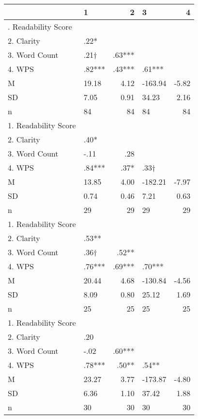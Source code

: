 \begin{longtable}{llrlr}
\toprule
  & 1 & 2 & 3 & 4 \\ 
\midrule\addlinespace[2.5pt]
1. Readability Score &  &  &  &  \\ 
2. Clarity &  .22* &  &  &  \\ 
3. Word Count &  .21† &  .63*** &  &  \\ 
4. WPS &  .82*** &  .43*** &  .61*** &  \\ 
M & 19.18 & 4.12 & -163.94 & -5.82 \\ 
SD & 7.05 & 0.91 & 34.23 & 2.16 \\ 
n & 84 & 84 & 84 & 84 \\ 
1. Readability Score &  &  &  &  \\ 
2. Clarity &  .40* &  &  &  \\ 
3. Word Count & -.11  &  .28  &  &  \\ 
4. WPS &  .84*** &  .37* &  .33† &  \\ 
M & 13.85 & 4.00 & -182.21 & -7.97 \\ 
SD & 0.74 & 0.46 & 7.21 & 0.63 \\ 
n & 29 & 29 & 29 & 29 \\ 
1. Readability Score &  &  &  &  \\ 
2. Clarity &  .53** &  &  &  \\ 
3. Word Count &  .36† &  .52** &  &  \\ 
4. WPS &  .76*** &  .69*** &  .70*** &  \\ 
M & 20.44 & 4.68 & -130.84 & -4.56 \\ 
SD & 8.09 & 0.80 & 25.12 & 1.69 \\ 
n & 25 & 25 & 25 & 25 \\ 
1. Readability Score &  &  &  &  \\ 
2. Clarity &  .20  &  &  &  \\ 
3. Word Count & -.02  &  .60*** &  &  \\ 
4. WPS &  .78*** &  .50** &  .54** &  \\ 
M & 23.27 & 3.77 & -173.87 & -4.80 \\ 
SD & 6.36 & 1.10 & 37.42 & 1.88 \\ 
n & 30 & 30 & 30 & 30 \\ 
\bottomrule
\end{longtable}

